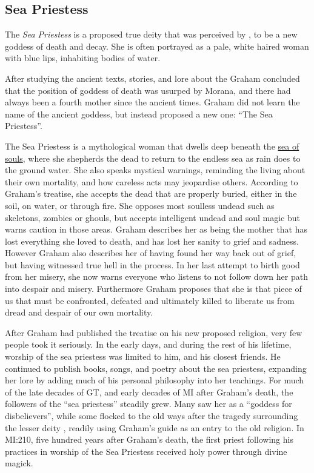 \subsection{Sea Priestess}
\label{sec:Sea Priestess}

The \emph{Sea Priestess} is a proposed true deity that was perceived by
, to be a new goddess of death and decay. She is
often portrayed as a pale, white haired woman with blue lips, inhabiting
bodies of water.

After studying the ancient texts, stories, and lore about the  Graham concluded that the position of goddess of death was usurped by
Morana, and there had always been a fourth mother since the ancient times.
Graham did not learn the name of the ancient goddess, but instead proposed a
new one: ``The Sea Priestess''.

The Sea Priestess is a mythological woman that dwells deep beneath the
\hyperref[sec:Soul Well]{sea of souls}, where she shepherds the dead to
return to the endless sea as rain does to the ground water. She also speaks
mystical warnings, reminding the living about their own mortality, and how
careless acts may jeopardise others. According to Graham's treatise, she
accepts the dead that are properly buried, either in the soil, on water, or
through fire. She opposes most soulless undead such as skeletons, zombies or
ghouls, but accepts intelligent undead and soul magic but warns caution in
those areas. Graham describes her as being the mother that has lost everything
she loved to death, and has lost her sanity to grief and sadness. However Graham
also describes her of having found her way back out of grief, but having
witnessed true hell in the process. In her last attempt to birth good from her
misery, she now warns everyone who listens to not follow down her path into
despair and misery. Furthermore Graham proposes that she is that piece of us
that must be confronted, defeated and ultimately killed to liberate us from
dread and despair of our own mortality.

After Graham had published the treatise on his new proposed religion, very
few people took it seriously. In the early days, and during the rest of his
lifetime, worship of the sea priestess was limited to him, and his closest
friends. He continued to publish books, songs, and poetry about the sea
priestess, expanding her lore by adding much of his personal philosophy into
her teachings. For much of the late decades of GT, and early decades of MI
after Graham's death, the followers of the ``sea priestess'' steadily grew.
Many saw her as a ``goddess for disbelievers'', while some flocked to the old
ways after the tragedy surrounding the lesser deity ,
readily using Graham's guide as an entry to the old religion.  In MI:210, five
hundred years after Graham's death, the first priest following his practices
in worship of the Sea Priestess received holy power through divine magick.


